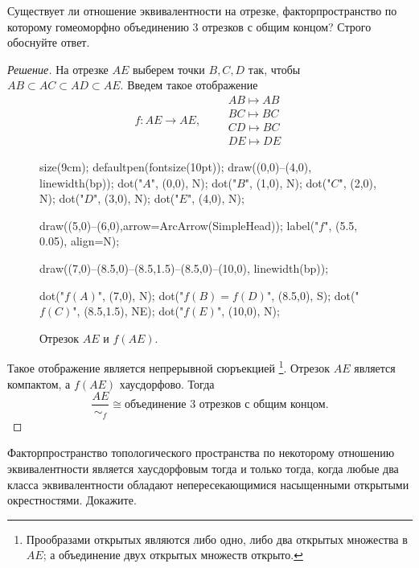 \documentclass[10pt]{article}
\begin{document}
\tableofcontents
\begin{tasks}
	 \item  Существует ли отношение эквивалентности на отрезке, факторпространство по которому гомеоморфно объединению 3 отрезков с общим концом? Строго обоснуйте ответ.
	
	\begin{proof}[Решение]
		На отрезке $AE$ выберем точки $B, C, D$ так, чтобы $AB \subset AC \subset AD \subset AE.$ Введем такое отображение $$f \colon AE \to AE, \qquad \left.\begin{aligned}
			AB \mapsto AB\\
			BC \mapsto BC\\
			CD \mapsto BC\\
			DE \mapsto DE
		\end{aligned} \right.$$
		
		\begin{figure}[h]
			\centering
			\begin{asy}
				size(9cm);
				defaultpen(fontsize(10pt));
				draw((0,0)--(4,0), linewidth(bp));
				dot("$A$", (0,0), N);
				dot("$B$", (1,0), N);
				dot("$C$", (2,0), N);
				dot("$D$", (3,0), N);
				dot("$E$", (4,0), N);
				
				draw((5,0)--(6,0),arrow=ArcArrow(SimpleHead));
				label("$f$", (5.5, 0.05), align=N);
				
				draw((7,0)--(8.5,0)--(8.5,1.5)--(8.5,0)--(10,0), linewidth(bp));
				
				dot("$f(A)$", (7,0), N);
				dot("$f(B)=f(D)$", (8.5,0), S);
				dot("$f(C)$", (8.5,1.5), NE);
				dot("$f(E)$", (10,0), N);
				
			\end{asy}
			\caption{Отрезок $AE$ и $f(AE)$.}
		\end{figure}
		
		Такое отображение является непрерывной сюръекцией \footnote{Прообразами открытых являются либо одно, либо два открытых множества в $AE$; а объединение двух открытых множеств открыто.}. Отрезок $AE$ является компактом, а $f(AE)$ хаусдорфово. Тогда \[\frac{AE}{\sim_f} \cong \text{объединение 3 отрезков с общим концом}.\]  
		
	\end{proof}
	\pagebreak
	\vspace{-6mm}
	
	 \item Факторпространство топологического пространства по некоторому отношению эквивалентности является хаусдорфовым тогда и только тогда, когда любые два класса эквивалентности обладают непересекающимися насыщенными открытыми окрестностями. Докажите.
	

\end{tasks}
\end{document}
